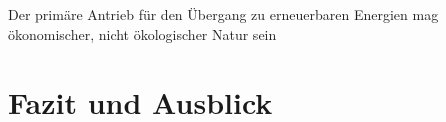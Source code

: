 Der primäre Antrieb für den Übergang zu erneuerbaren Energien mag ökonomischer, nicht ökologischer Natur sein
\chapter{Fazit und Ausblick}



